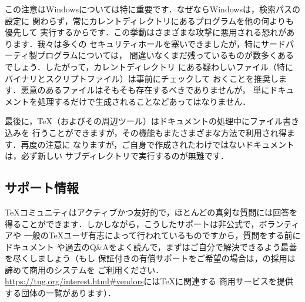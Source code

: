 \documentclass[uplatex,dvipdfmx,tombow]{jsarticle}
\begin{document}
この注意はWindowsについては特に重要です．なぜならWindowsは，検索パスの設定に
関わらず，常にカレントディレクトリにあるプログラムを他の何よりも優先して
実行するからです．この挙動はさまざまな攻撃に悪用される恐れがあります．我々は多くの
セキュリティホールを塞いできましたが，特にサードパーティ製プログラムについては，
間違いなくまだ残っているものが数多くあるでしょう．したがって，カレントディレクトリ
にある疑わしいファイル（特にバイナリとスクリプトファイル）は事前にチェックして
おくことを推奨します．悪意のあるファイルはそもそも存在するべきでありませんが，
単にドキュメントを処理するだけで生成されることなどあってはなりません．

最後に，\TeX （およびその周辺ツール）はドキュメントの処理中にファイル書き込みを
行うことができますが，その機能もまたさまざまな方法で利用され得ます．再度の注意に
なりますが，ご自身で作成されたわけではないドキュメントは，必ず新しい
サブディレクトリで実行するのが無難です．

\subsection{サポート情報}
\label{sec:help}

\TeX コミュニティはアクティブかつ友好的で，ほとんどの真剣な質問には回答を
得ることができます．しかしながら，こうしたサポートは非公式で，ボランティアや
一般の\TeX ユーザ有志によって行われているものですから，質問をする前にドキュメント
や過去のQ\&Aをよく読んで，まずはご自分で解決できるよう最善を尽くしましょう（もし
保証付きの有償サポートをご希望の場合は，\TL の採用は諦めて商用のシステムを
ご利用ください．\url{https://tug.org/interest.html#vendors}には\TeX に関連する
商用サービスを提供する団体の一覧があります）．
\end{document}
